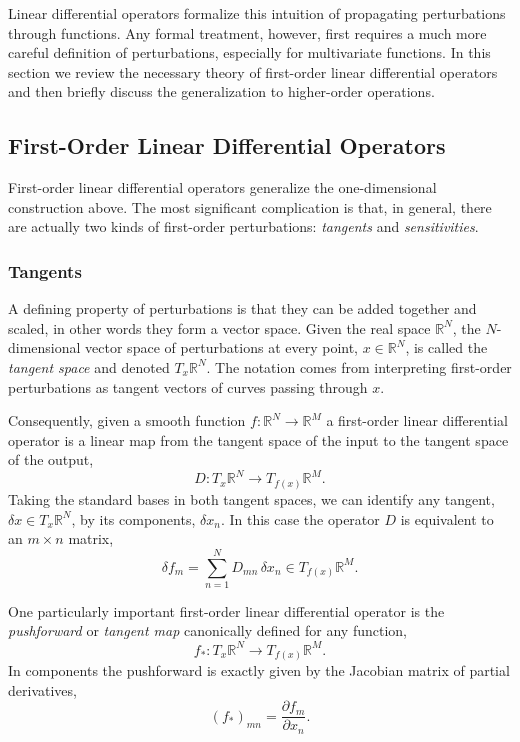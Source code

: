 Linear differential operators formalize this intuition of propagating perturbations
through functions.  Any formal treatment, however, first requires a much more
careful definition of perturbations, especially for multivariate functions.  In this
section we review the necessary theory of first-order linear differential operators
and then briefly discuss the generalization to higher-order operations.

\subsection{First-Order Linear Differential Operators}

First-order linear differential operators generalize the one-dimensional construction
above.  The most significant complication is that, in general, there are actually two 
kinds of first-order perturbations: \textit{tangents} and \textit{sensitivities}.

\subsubsection{Tangents}

A defining property of perturbations is that they can be added together and scaled,
in other words they form a vector space.  Given the real space $\mathbb{R}^{N}$,
the $N$-dimensional vector space of perturbations at every point, $x \in \mathbb{R}^{N}$, 
is called the \textit{tangent space} and denoted $T_{x} \mathbb{R}^{N}$.  The notation
comes from interpreting first-order perturbations as tangent vectors of curves
passing through $x$.

Consequently, given a smooth function $f : \mathbb{R}^{N} \rightarrow \mathbb{R}^{M}$
a first-order linear differential operator is a linear map from the tangent space of
the input to the tangent space of the output,
%
\begin{equation*}
D : T_{x} \mathbb{R}^{N} \rightarrow T_{ f ( x ) } \mathbb{R}^{M}.
\end{equation*}
%
Taking the standard bases in both tangent spaces, we can identify any tangent,
$\delta x \in T_{x} \mathbb{R}^{N}$, by its components, $\delta x_{n}$.  In this case
the operator $D$ is equivalent to an $m \times n$ matrix,
%
\begin{equation*}
\delta f_{m} = \sum_{n = 1}^{N} D_{mn} \, \delta x_{n} \in T_{f(x)} \mathbb{R}^{M}.
\end{equation*}

One particularly important first-order linear differential operator is the \textit{pushforward}
or \textit{tangent map} canonically defined for any function,
%
\begin{equation*}
f_{*} : T_{x} \mathbb{R}^{N} \rightarrow T_{ f ( x ) } \mathbb{R}^{M}.
\end{equation*}
%
In components the pushforward is exactly given by the Jacobian matrix of partial derivatives,
%
\begin{equation*}
\left( f_{*} \right)_{mn} = \frac{ \partial f_{m} }{ \partial x_{n} }.
\end{equation*}

